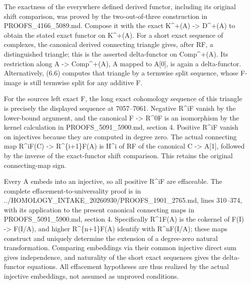 The exactness of the everywhere defined derived functor,\allowbreak{} including its original shift comparison,\allowbreak{} was proved by the two-out-of-three construction in PROOFS\_\allowbreak{}4166\_\allowbreak{}5089.md. Compose it with the exact K\textasciicircum{}\allowbreak{}+(A)\allowbreak{} \allowbreak{}-> D\textasciicircum{}\allowbreak{}+(A)\allowbreak{} to obtain the stated exact functor on K\textasciicircum{}\allowbreak{}+(A)\allowbreak{}. For a short exact sequence of complexes,\allowbreak{} the canonical derived connecting triangle gives,\allowbreak{} after RF,\allowbreak{} a distinguished triangle; this is the asserted delta-functor on Comp\textasciicircum{}\allowbreak{}+(A)\allowbreak{}. Its restriction along A \allowbreak{}-> Comp\textasciicircum{}\allowbreak{}+(A)\allowbreak{},\allowbreak{} A mapped to A[0]\allowbreak{},\allowbreak{} is again a delta-functor. Alternatively,\allowbreak{} (6.6)\allowbreak{} computes that triangle by a termwise split sequence,\allowbreak{} whose F-image is still termwise split for any additive F.

For the source\textquotesingle s left exact F,\allowbreak{} the long exact cohomology sequence of this triangle is precisely the displayed sequence at 7057–\allowbreak{}7061. Negative R\^{}iF vanish by the lower-bound argument,\allowbreak{} and the canonical F \allowbreak{}-> R\^{}0F is an isomorphism by the kernel calculation in PROOFS\_\allowbreak{}5091\_\allowbreak{}5900.md,\allowbreak{} section 4. Positive R\^{}iF vanish on injectives because they are computed in degree zero. The actual connecting map R\textasciicircum{}iF(C)\allowbreak{} \allowbreak{}-> R\textasciicircum{}\{i\allowbreak{}+1\}F(A)\allowbreak{} is H\^{}i of RF of the canonical C \allowbreak{}-> A[1]\allowbreak{},\allowbreak{} followed by the inverse of the exact-functor shift comparison. This retains the original connecting-map sign.

Every A embeds into an injective,\allowbreak{} so all positive R\^{}iF are effaceable. The complete effacement-to-universality proof is in ../\allowbreak{}HOMOLOGY\_\allowbreak{}INTAKE\_\allowbreak{}20260930/\allowbreak{}PROOFS\_\allowbreak{}1901\_\allowbreak{}2765.md,\allowbreak{} lines 310–\allowbreak{}374,\allowbreak{} with its application to the present canonical connecting maps in PROOFS\_\allowbreak{}5091\_\allowbreak{}5900.md,\allowbreak{} section 4. Specifically R\textasciicircum{}1F(A)\allowbreak{} is the cokernel of F(I)\allowbreak{} \allowbreak{}-> F(I/\allowbreak{}A)\allowbreak{},\allowbreak{} and higher R\textasciicircum{}\{n\allowbreak{}+1\}F(A)\allowbreak{} identify with R\textasciicircum{}nF(I/\allowbreak{}A)\allowbreak{}; these maps construct and uniquely determine the extension of a degree-zero natural transformation. Comparing embeddings via their common injective direct sum gives independence,\allowbreak{} and naturality of the short exact sequences gives the delta-functor equations. All effacement hypotheses are thus realized by the actual injective embeddings,\allowbreak{} not assumed as unproved conditions.

